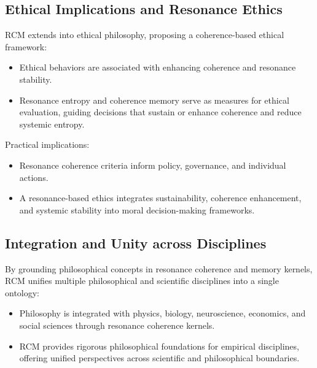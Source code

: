 \subsection{Ethical Implications and Resonance Ethics}
RCM extends into ethical philosophy, proposing a coherence-based ethical framework:
\begin{itemize}
  \item Ethical behaviors are associated with enhancing coherence and resonance stability.
  \item Resonance entropy and coherence memory serve as measures for ethical evaluation, guiding decisions that sustain or enhance coherence and reduce systemic entropy.
\end{itemize}
Practical implications:
\begin{itemize}
  \item Resonance coherence criteria inform policy, governance, and individual actions.
  \item A resonance-based ethics integrates sustainability, coherence enhancement, and systemic stability into moral decision-making frameworks.
\end{itemize}

\subsection{Integration and Unity across Disciplines}
By grounding philosophical concepts in resonance coherence and memory kernels, RCM unifies multiple philosophical and scientific disciplines into a single ontology:
\begin{itemize}
  \item Philosophy is integrated with physics, biology, neuroscience, economics, and social sciences through resonance coherence kernels.
  \item RCM provides rigorous philosophical foundations for empirical disciplines, offering unified perspectives across scientific and philosophical boundaries.
\end{itemize}

